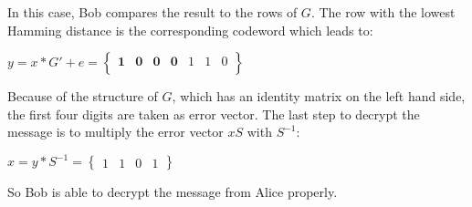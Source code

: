 In this case, Bob compares the result to the rows of $G$. The row with the lowest Hamming distance is the corresponding codeword which leads to: 
\begin{center}
	$
	y = x*G'+e =
	\begin{Bmatrix}
	\textbf{1} & \textbf{0} & \textbf{0} & \textbf{0} & 1 & 1 & 0 \\
	\end{Bmatrix}
	$
\end{center}
Because of the structure of $G$, which has an identity matrix on the left hand side, the first four digits are taken as error vector.
The last step to decrypt the message is to multiply the error vector $xS$ with $S^{-1}$:
\begin{center}
$
x = y * S^{-1} = 	
\begin{Bmatrix}
	1 & 1 & 0 & 1
\end{Bmatrix}
$
\end{center}
So Bob is able to decrypt the message from Alice properly. 


